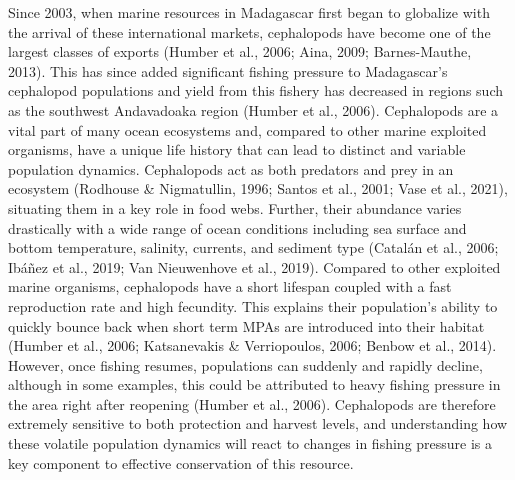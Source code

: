 \documentclass[
]{article}
\begin{document}
Since 2003, when marine resources in Madagascar first began to globalize with the arrival of these international markets, cephalopods have become one of the largest classes of exports (Humber et al., 2006; Aina, 2009; Barnes-Mauthe, 2013). This has since added significant fishing pressure to Madagascar's cephalopod populations and yield from this fishery has decreased in regions such as the southwest Andavadoaka region (Humber et al., 2006). Cephalopods are a vital part of many ocean ecosystems and, compared to other marine exploited organisms, have a unique life history that can lead to distinct and variable population dynamics. Cephalopods act as both predators and prey in an ecosystem (Rodhouse \& Nigmatullin, 1996; Santos et al., 2001; Vase et al., 2021), situating them in a key role in food webs. Further, their abundance varies drastically with a wide range of ocean conditions including sea surface and bottom temperature, salinity, currents, and sediment type (Catalán et al., 2006; Ibáñez et al., 2019; Van Nieuwenhove et al., 2019). Compared to other exploited marine organisms, cephalopods have a short lifespan coupled with a fast reproduction rate and high fecundity. This explains their population's ability to quickly bounce back when short term MPAs are introduced into their habitat (Humber et al., 2006; Katsanevakis \& Verriopoulos, 2006; Benbow et al., 2014). However, once fishing resumes, populations can suddenly and rapidly decline, although in some examples, this could be attributed to heavy fishing pressure in the area right after reopening (Humber et al., 2006). Cephalopods are therefore extremely sensitive to both protection and harvest levels, and understanding how these volatile population dynamics will react to changes in fishing pressure is a key component to effective conservation of this resource.
\end{document}

